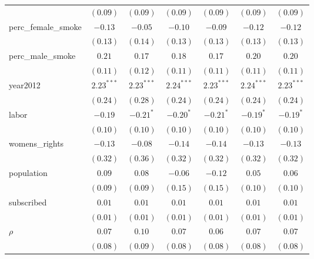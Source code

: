 \begin{table}[!h]
\begin{center}
\begin{tabular}{l c c c c c c }
                        & $(0.09)$     & $(0.09)$     & $(0.09)$     & $(0.09)$     & $(0.09)$     & $(0.09)$     \\
perc\_female\_smoke     & $-0.13$      & $-0.05$      & $-0.10$      & $-0.09$      & $-0.12$      & $-0.12$      \\
                        & $(0.13)$     & $(0.14)$     & $(0.13)$     & $(0.13)$     & $(0.13)$     & $(0.13)$     \\
perc\_male\_smoke       & $0.21$       & $0.17$       & $0.18$       & $0.17$       & $0.20$       & $0.20$       \\
                        & $(0.11)$     & $(0.12)$     & $(0.11)$     & $(0.11)$     & $(0.11)$     & $(0.11)$     \\
year2012                & $2.23^{***}$ & $2.23^{***}$ & $2.24^{***}$ & $2.23^{***}$ & $2.24^{***}$ & $2.23^{***}$ \\
                        & $(0.24)$     & $(0.28)$     & $(0.24)$     & $(0.24)$     & $(0.24)$     & $(0.24)$     \\
labor                   & $-0.19$      & $-0.21^{*}$  & $-0.20^{*}$  & $-0.21^{*}$  & $-0.19^{*}$  & $-0.19^{*}$  \\
                        & $(0.10)$     & $(0.10)$     & $(0.10)$     & $(0.10)$     & $(0.10)$     & $(0.10)$     \\
womens\_rights          & $-0.13$      & $-0.08$      & $-0.14$      & $-0.14$      & $-0.13$      & $-0.13$      \\
                        & $(0.32)$     & $(0.36)$     & $(0.32)$     & $(0.32)$     & $(0.32)$     & $(0.32)$     \\
population              & $0.09$       & $0.08$       & $-0.06$      & $-0.12$      & $0.05$       & $0.06$       \\
                        & $(0.09)$     & $(0.09)$     & $(0.15)$     & $(0.15)$     & $(0.10)$     & $(0.10)$     \\
subscribed              & $0.01$       & $0.01$       & $0.01$       & $0.01$       & $0.01$       & $0.01$       \\
                        & $(0.01)$     & $(0.01)$     & $(0.01)$     & $(0.01)$     & $(0.01)$     & $(0.01)$     \\
$\rho$                  & $0.07$       & $0.10$       & $0.07$       & $0.06$       & $0.07$       & $0.07$       \\
                        & $(0.08)$     & $(0.09)$     & $(0.08)$     & $(0.08)$     & $(0.08)$     & $(0.08)$     \\

\end{tabular}
\end{center}
\end{table}
